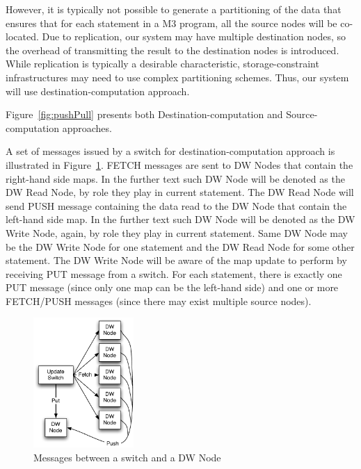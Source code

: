 \documentclass{sig-semester}
\def\M3{M3\xspace}
\begin{document}
However, it is typically not possible to generate a partitioning of the data that ensures that for each statement in a \M3 program, all the source nodes will be co-located. Due to replication, our system may have multiple destination nodes, so the overhead of transmitting the result to the destination nodes is introduced. While replication is typically a desirable characteristic, storage-constraint infrastructures may need to use complex partitioning schemes. Thus, our system will use destination-computation approach.

Figure~\ref{fig:pushPull} presents both Destination-computation and Source-computation approaches.

A set of messages issued by a switch for destination-computation approach is illustrated in Figure~\ref{fig:msgs}. FETCH messages are sent to DW Nodes that contain the right-hand side maps. In the further text such DW Node will be denoted as the DW Read Node, by role they play in current statement. The DW Read Node will send PUSH message containing the data read to the DW Node that contain the left-hand side map. In the further text such DW Node will be denoted as the DW Write Node, again, by role they play in current statement. Same DW Node may be the DW Write Node for one statement and the DW Read Node for some other statement. The DW Write Node will be aware of the map update to perform by receiving PUT message from a switch. For each statement, there is exactly one PUT message (since only one map can be the left-hand side) and one or more FETCH/PUSH messages (since there may exist multiple source nodes).

\begin{figure}
\begin{center}
\includegraphics[width=1.5in]{UpdateStep.pdf}
\vspace{-3mm}
\caption{Messages between a switch and a DW Node}
\label{fig:msgs}
\vspace{-9mm}
\end{center}
\end{figure}
\end{document}

